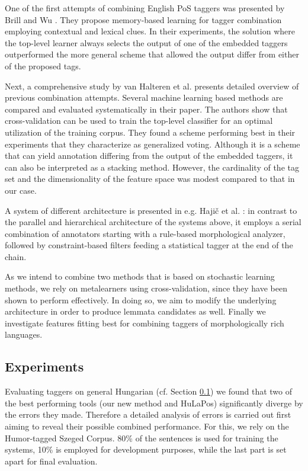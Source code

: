 One of the first attempts of combining English PoS taggers was presented by Brill and Wu \cite{Brill1998}. 
They propose memory-based learning for tagger combination employing contextual and lexical clues.
In their experiments, the solution where the top-level learner always selects the output of one of the embedded taggers outperformed the more general scheme that allowed the output differ from either of the proposed tags.

Next, a comprehensive study by van Halteren et al. \cite{Halteren2001} presents detailed overview of previous combination attempts.
Several machine learning based methods are compared and evaluated systematically in their paper. 
The authors show that cross-validation can be used to train the top-level classifier for an optimal utilization of the training corpus. 
They found a scheme performing best in their experiments that they characterize as generalized voting. Although it is a scheme that can yield annotation differing from the output of the embedded taggers, it can also be interpreted as a stacking method. 
However, the cardinality of the tag set and the dimensionality of the feature space was modest compared to that in our case.

A system of different architecture is presented in e.g. Hajič et al. \cite{Hajic2001}: in contrast to the parallel and hierarchical architecture of the systems above, it employs a serial combination of annotators starting with a rule-based morphological analyzer, followed by constraint-based filters feeding a statistical tagger at the end of the chain. %

As we intend to combine two methods that is based on stochastic learning methods, we rely on metalearners using cross-validation, since they have been shown \cite{Brill1998,Halteren2001} to perform effectively. In doing so, we aim to modify the underlying architecture in order to produce lemmata candidates as well. Finally we investigate features fitting best for combining taggers of  morphologically rich languages. 

\subsection{Experiments}

Evaluating taggers on general Hungarian (cf. Section \ref{}) we found that two of the best performing tools (our new method and HuLaPos) significantly diverge by the errors they made. Therefore a detailed analysis of errors is carried out first aiming to reveal their possible combined performance. For this, we rely on the Humor-tagged Szeged Corpus. 80\% of the sentences is used for training the systems, 10\%  is employed for development purposes, while the last part is set apart for final evaluation.

